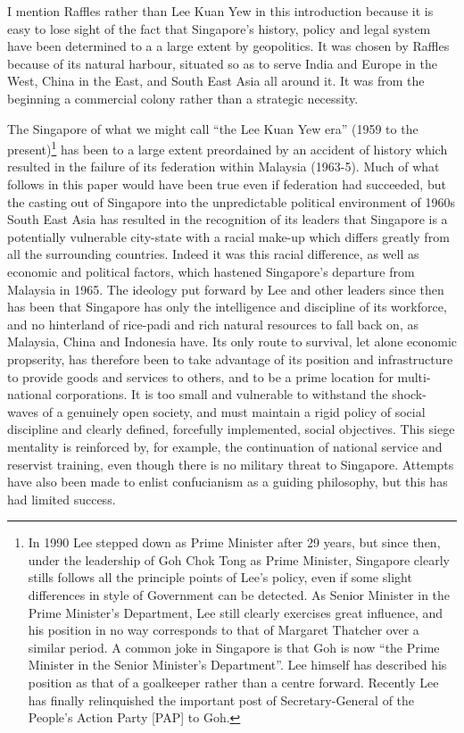 I mention Raffles rather than Lee Kuan Yew in this introduction
because it is easy to lose sight of the fact that Singapore's
history, policy and legal system have been determined to a a
large extent by geopolitics. It was chosen by Raffles because of
its natural harbour, situated so as to serve India and Europe in
the West, China in the East, and South East Asia all around it.
It was from the beginning a commercial colony rather than a
strategic necessity.

The Singapore of what we might call ``the Lee Kuan Yew era''
(1959 to the present)\footnote{ In 1990 Lee stepped down as Prime
  Minister after 29 years, but since then, under the leadership
  of Goh Chok Tong as Prime Minister, Singapore clearly stills
  follows all the principle points of Lee's policy, even if some
  slight differences in style of Government can be detected. As
  Senior Minister in the Prime Minister's Department, Lee still
  clearly exercises great influence, and his position in no way
  corresponds to that of Margaret Thatcher over a similar period.
  A common joke in Singapore is that Goh is now ``the Prime
  Minister in the Senior Minister's Department''. Lee himself has
  described his position as that of a goalkeeper rather than a
  centre forward. Recently Lee has finally relinquished the
  important post of Secretary-General of the People's Action
  Party [PAP] to Goh.} has been to a large extent preordained by
an accident of history which resulted in the failure of its
federation within Malaysia (1963-5). Much of what follows in this
paper would have been true even if federation had succeeded, but
the casting out of Singapore into the unpredictable political
environment of 1960s South East Asia has resulted in the
recognition of its leaders that Singapore is a potentially
vulnerable city-state with a racial make-up which differs greatly
from all the surrounding countries. Indeed it was this racial
difference, as well as economic and political factors, which
hastened Singapore's departure from Malaysia in 1965. The
ideology put forward by Lee and other leaders since then has been
that Singapore has only the intelligence and discipline of its
workforce, and no hinterland of rice-padi and rich natural
resources to fall back on, as Malaysia, China and Indonesia have.
Its only route to survival, let alone economic propserity, has
therefore been to take advantage of its position and
infrastructure to provide goods and services to others, and to be
a prime location for multi-national corporations. It is too small
and vulnerable to withstand the shock-waves of a genuinely open
society, and must maintain a rigid policy of social discipline
and clearly defined, forcefully implemented, social objectives.
This siege mentality is reinforced by, for example, the
continuation of national service and reservist training, even
though there is no military threat to Singapore. Attempts have
also been made to enlist confucianism as a guiding philosophy,
but this has had limited success.

